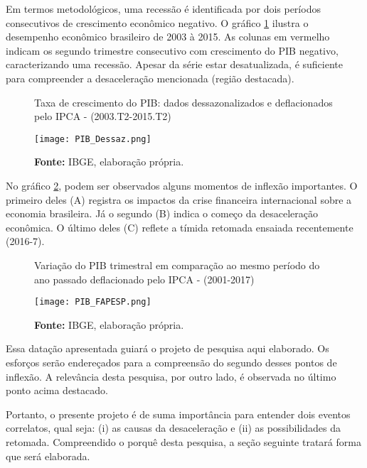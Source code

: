 \documentclass[12pt]{report}
\begin{document}
Em termos metodológicos, uma recessão é identificada por dois períodos consecutivos de crescimento econômico negativo. O gráfico \ref{graf2} ilustra o desempenho econômico brasileiro de 2003 à 2015. As colunas em vermelho indicam os segundo trimestre consecutivo com crescimento do PIB negativo, caracterizando uma recessão.
Apesar da série estar desatualizada, é suficiente para compreender a desaceleração mencionada (região destacada).




\begin{figure}[H]
	\begin{center}
		\caption{Taxa de crescimento do PIB: dados dessazonalizados e deflacionados pelo IPCA  - (2003.T2-2015.T2)}
		\label{graf2}
		\texttt{[image: PIB\_Dessaz.png]}
		\caption*{\textbf{Fonte:} IBGE, elaboração própria.}
	\end{center}
\end{figure}



No gráfico \ref{graf}, podem ser observados alguns momentos de inflexão importantes. O primeiro deles (A) registra os impactos da crise financeira internacional sobre a economia brasileira. Já o segundo (B) indica o começo da desaceleração econômica. O último deles (C) reflete a tímida retomada ensaiada recentemente (2016-7).


\begin{figure}[htb]
	\begin{center}
		\caption{Variação do PIB trimestral em comparação ao mesmo período do ano passado deflacionado pelo IPCA - (2001-2017)}
		\label{graf}
		\texttt{[image: PIB\_FAPESP.png]}
		\caption*{\textbf{Fonte:} IBGE, elaboração própria.}
	\end{center}
\end{figure}


Essa datação apresentada guiará o projeto de pesquisa aqui elaborado. Os esforços serão endereçados para a compreensão do segundo desses pontos de inflexão. A relevância desta pesquisa, por outro lado, é observada no último ponto acima destacado. 



Portanto, o presente projeto é de suma importância para entender dois eventos correlatos, qual seja: (i) as causas da desaceleração e (ii) as possibilidades da retomada. Compreendido o por\-quê desta pesquisa, a seção seguinte tratará forma que será elaborada.
\end{document}
